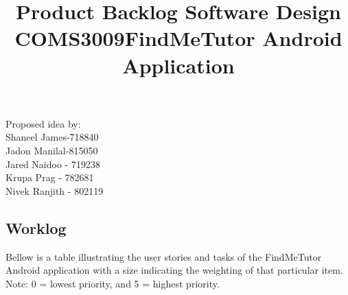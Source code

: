 \documentclass[12pt]{article}
\begin{document}
\title{\textbf{Product Backlog }}
\maketitle
\begin{center}
\title{\textbf{Software Design COMS3009}}
\maketitle 

\title{\textbf{FindMeTutor Android Application}}
\maketitle 
\end{center}


\begin{center}
Proposed idea by:\\
Shaneel James-718840
\\Jadon Manilal-815050
\\Jared Naidoo - 719238
\\Krupa Prag - 782681
\\Nivek Ranjith - 802119
\end{center}

\newpage
\tableofcontents
\newpage

\begin{flushleft}

\section{Worklog}
Bellow is a table illustrating the user stories and tasks of the FindMeTutor Android application with a size indicating the weighting of that particular item. Note: 0 = lowest priority, and 5 = highest priority.
\end{flushleft}
\end{document}
